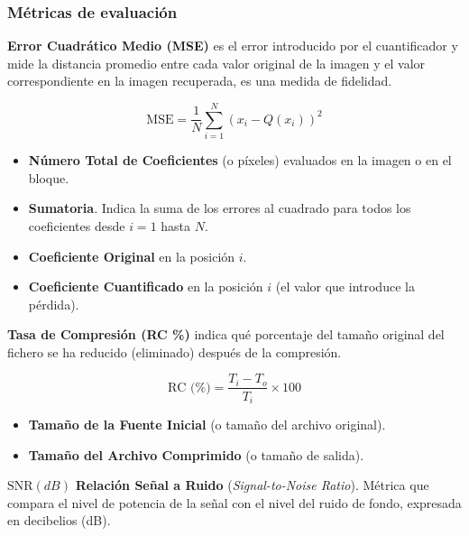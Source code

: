 \documentclass[a4paper, 12pt]{article}
\begin{document}
\subsubsection{Métricas de evaluación}

\textbf{Error Cuadrático Medio (MSE)} es el error introducido por el cuantificador y mide la distancia promedio entre cada valor original de la imagen y el valor correspondiente en la imagen recuperada, es una medida de fidelidad.


\begin{equation}
\text{MSE} = \frac{1}{N} \sum_{i=1}^{N} \left( x_{i} - Q(x_{i}) \right)^2
\end{equation}

\begin{itemize}
    \item[$N$] \textbf{Número Total de Coeficientes} (o píxeles) evaluados en la imagen o en el bloque.
    \item[$\sum_{i=1}^{N}$] \textbf{Sumatoria}. Indica la suma de los errores al cuadrado para todos los coeficientes desde $i=1$ hasta $N$.
    \item[$x_{i}$] \textbf{Coeficiente Original} en la posición $i$.
    \item[$Q(x_{i})$] \textbf{Coeficiente Cuantificado} en la posición $i$ (el valor que introduce la pérdida).
\end{itemize}
\vspace{0.5cm}

\textbf{Tasa de Compresión (RC \%)} indica qué porcentaje del tamaño original del fichero se ha reducido (eliminado) después de la compresión.


\begin{equation}
\text{RC (\%)} = \frac{T_{i} - T_{o}}{T_{i}} \times 100
\end{equation}

\begin{itemize}
    \item[$T_{i}$] \textbf{Tamaño de la Fuente Inicial} (o tamaño del archivo original).
    \item[$T_{o}$] \textbf{Tamaño del Archivo Comprimido} (o tamaño de salida).
\end{itemize}
\vspace{0.5cm}

$\text{SNR}(dB)$ \textbf{Relación Señal a Ruido} (\textit{Signal-to-Noise Ratio}). Métrica que compara el nivel de potencia de la señal con el nivel del ruido de fondo, expresada en decibelios (dB).
\end{document}
